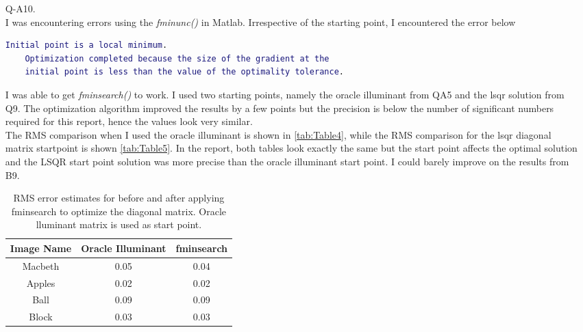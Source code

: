 \documentclass[12pt]{report}
\begin{document}
\begin{enumerate}
    \item[Q-A10.]
    \ \\
    I was encountering errors using the \emph{fminunc()} in Matlab. Irrespective of the starting point, I encountered the error below
    \begin{lstlisting}[language=Matlab]
    Initial point is a local minimum.
    Optimization completed because the size of the gradient at the 
    initial point is less than the value of the optimality tolerance.
    \end{lstlisting}
    I was able to get \emph{fminsearch()} to work. I used two starting points, namely the oracle illuminant from QA5 and the lsqr solution from Q9. The optimization 
    algorithm improved the results by a few points but the precision is below the number of significant numbers required for this report, hence the values look very similar. \\
    The RMS comparison when I used the oracle illuminant is shown in \autoref{tab:Table4}, while the RMS comparison for the lsqr diagonal matrix startpoint is shown 
    \autoref{tab:Table5}. In the report, both tables look exactly the same but the start point affects the optimal solution and the LSQR start point solution was more 
    precise than the oracle illuminant start point. I could barely improve on the results from B9.

    \begin{table}[h!]
    \begin{center}
    \begin{tabular}{ | c | c | c | } 
        \hline
        Image Name & Oracle Illuminant & fminsearch \\ 
        \hline \hline
        Macbeth & 0.05 & 0.04 \\ 
        Apples & 0.02 & 0.02 \\ 
        Ball & 0.09 & 0.09 \\ 
        Block & 0.03 & 0.03 \\ 
        \hline
    \end{tabular}
    \caption{RMS error estimates for before and after applying fminsearch to optimize the diagonal matrix. Oracle lluminant matrix is used as start point.}
    \label{tab:Table4}
    \end{center}
    \end{table}


\end{enumerate}
\end{document}
